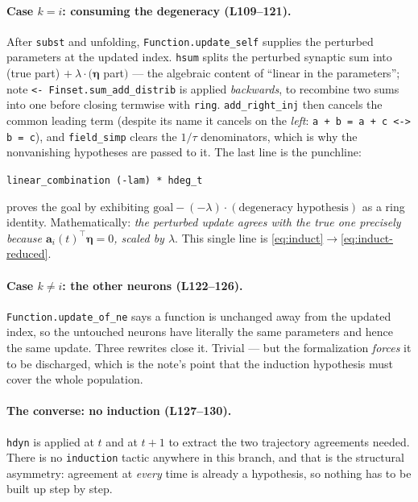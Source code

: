 \documentclass[11pt]{article}
\newcommand{\Mat}[1]{\mathbf{#1}}
\begin{document}
\paragraph{Case $k=i$: consuming the degeneracy (L109--121).} After
\texttt{subst} and unfolding, \texttt{Function.update\_self} supplies the
perturbed parameters at the updated index. \texttt{hsum} splits the
perturbed synaptic sum into (true part) $+\ \lambda\cdot(\boldsymbol\eta$
part$)$ --- the algebraic content of ``linear in the parameters'';
note \texttt{<-\,Finset.sum\_add\_distrib} is applied \emph{backwards}, to
recombine two sums into one before closing termwise with \texttt{ring}.
\texttt{add\_right\_inj} then cancels the common leading term (despite its
name it cancels on the \emph{left}: \texttt{a + b = a + c <-> b = c}), and
\texttt{field\_simp} clears the $1/\tau$ denominators, which is why the
nonvanishing hypotheses are passed to it. The last line is the punchline:
\begin{center}
\texttt{linear\_combination (-lam) * hdeg\_t}
\end{center}
proves the goal by exhibiting $\text{goal}-(-\lambda)\cdot(\text{degeneracy
hypothesis})$ as a ring identity. Mathematically: \emph{the perturbed update
agrees with the true one precisely because $\Mat
a_i(t)^{\!\top}\boldsymbol\eta=0$, scaled by $\lambda$}. This single line is
\eqref{eq:induct}$\to$\eqref{eq:induct-reduced}.

\paragraph{Case $k\neq i$: the other neurons (L122--126).}
\texttt{Function.update\_of\_ne} says a function is unchanged away from the
updated index, so the untouched neurons have literally the same parameters
and hence the same update. Three rewrites close it. Trivial --- but the
formalization \emph{forces} it to be discharged, which is the note's point
that the induction hypothesis must cover the whole population.

\paragraph{The converse: no induction (L127--130).} \texttt{hdyn} is applied
at $t$ and at $t{+}1$ to extract the two trajectory agreements needed. There
is no \texttt{induction} tactic anywhere in this branch, and that is the
structural asymmetry: agreement at \emph{every} time is already a
hypothesis, so nothing has to be built up step by step.
\end{document}
